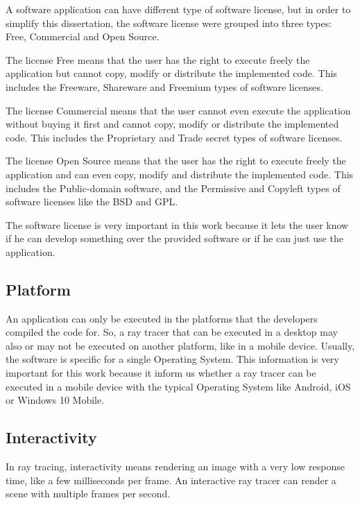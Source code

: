 \par
A software application can have different type of software license, but in order to simplify this dissertation, the software license were grouped into three types: Free, Commercial and Open Source.
\par
The license Free means that the user has the right to execute freely the application but cannot copy, modify or distribute the implemented code.
This includes the Freeware, Shareware and Freemium types of software licenses.
\par
The license Commercial means that the user cannot even execute the application without buying it first and cannot copy, modify or distribute the implemented code.
This includes the Proprietary and Trade secret types of software licenses.
\par
The license Open Source means that the user has the right to execute freely the application and can even copy, modify and distribute the implemented code.
This includes the Public-domain software, and the Permissive and Copyleft types of software licenses like the BSD and GPL.
\par
The software license is very important in this work because it lets the user know if he can develop something over the provided software or if he can just use the application.

\subsection{Platform}

\par
An application can only be executed in the platforms that the developers compiled the code for.
So, a ray tracer that can be executed in a desktop may also or may not be executed on another platform, like in a mobile device.
Usually, the software is specific for a single Operating System.
This information is very important for this work because it inform us whether a ray tracer can be executed in a mobile device with the typical Operating System like Android, iOS or Windows 10 Mobile.

\subsection{Interactivity}

\par
In ray tracing, interactivity means rendering an image with a very low response time, like a few milliseconds per frame.
An interactive ray tracer can render a scene with multiple frames per second.

